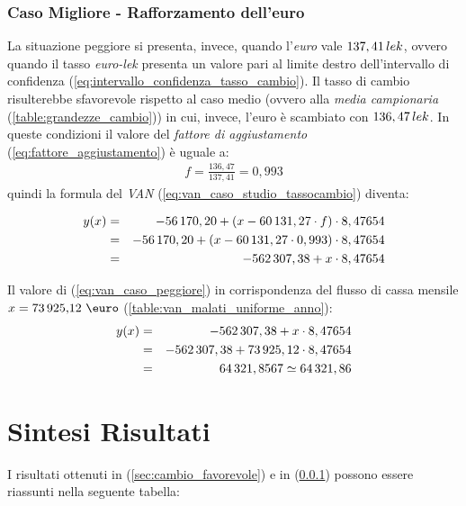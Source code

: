 \subsubsection[Caso Migliore - Rafforzamento dell'euro]{Caso Migliore - Rafforzamento dell'euro}
\label{sec:cambio_sfavorevole}
La situazione peggiore si presenta, invece, quando l'\emph{euro} vale $137,41 \thinspace lek$, ovvero quando il tasso \emph{euro-lek} presenta un valore pari al limite destro dell'intervallo di confidenza (\ref{eq:intervallo_confidenza_tasso_cambio}). Il tasso di cambio risulterebbe sfavorevole rispetto al caso medio (ovvero alla \textit{media campionaria} (\ref{table:grandezze_cambio})) in cui, invece, l'euro è scambiato con $136,47 \thinspace lek$.\newline
In queste condizioni il valore del \textit{fattore di aggiustamento}  (\ref{eq:fattore_aggiustamento}) è uguale a:
\begin{equation}
\label{eq:fattore_aggiustamento_caso_peggiore}
\begin{split}
f = \frac{136,47}{137,41} = 0,993
\end{split}
\end{equation}
quindi la formula del \emph{\ac{VAN}} (\ref{eq:van_caso_studio_tassocambio}) diventa:

\begin{eqnarray}
\label{eq:van_caso_peggiore}
 		y(x) & = & -56\thinspace 170,20 + (x - 60\thinspace 131,27 \cdot f) \cdot 8,47654 \nonumber \\
 			 & = & -56\thinspace 170,20 + (x - 60\thinspace 131,27 \cdot 0,993) \cdot 8,47654 \nonumber \\
 			 & = & -562\thinspace 307,38 + x \cdot 8,47654
\end{eqnarray}

Il valore di (\ref{eq:van_caso_peggiore}) in corrispondenza del flusso di cassa mensile $ x = \mbox{73\thinspace 925,12 \euro}$ (\ref{table:van_malati_uniforme_anno}):
\begin{eqnarray}
\label{eq:van_flusso_cassa_malati_uniforme_caso_peggiore}
 		y(x) & = & -562\thinspace 307,38 + x \cdot 8,47654 \nonumber \\
 			 & = & -562\thinspace 307,38 + 73\thinspace 925,12 \cdot 8,47654 \nonumber \\
 			 & = & 64\thinspace 321,8567 \simeq 64\thinspace 321,86
\end{eqnarray}

\clearpage
\section[Sintesi Risultati]{Sintesi Risultati}
I risultati ottenuti in (\ref{sec:cambio_favorevole}) e in (\ref{sec:cambio_sfavorevole}) possono essere riassunti nella seguente tabella:


